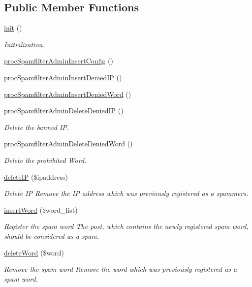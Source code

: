 \subsection*{Public Member Functions}
\begin{DoxyCompactItemize}
\item 
\hyperlink{classspamfilterAdminController_a28483831891491011017a8527221e3f3}{init} ()
\begin{DoxyCompactList}\small\item\em Initialization. \end{DoxyCompactList}\item 
\hyperlink{classspamfilterAdminController_a34c10f8c63e96895ad110241d37577fa}{proc\+Spamfilter\+Admin\+Insert\+Config} ()
\item 
\hyperlink{classspamfilterAdminController_a9f0828d5ddc3b978a7f9de739a27e8c6}{proc\+Spamfilter\+Admin\+Insert\+Denied\+IP} ()
\item 
\hyperlink{classspamfilterAdminController_a8cc8354d502de92a6413aec6be3c0376}{proc\+Spamfilter\+Admin\+Insert\+Denied\+Word} ()
\item 
\hyperlink{classspamfilterAdminController_a720e0592f60455d125b55ee797de2436}{proc\+Spamfilter\+Admin\+Delete\+Denied\+IP} ()
\begin{DoxyCompactList}\small\item\em Delete the banned IP. \end{DoxyCompactList}\item 
\hyperlink{classspamfilterAdminController_aeb21ee58872bf61875be7e0fffabcf3a}{proc\+Spamfilter\+Admin\+Delete\+Denied\+Word} ()
\begin{DoxyCompactList}\small\item\em Delete the prohibited Word. \end{DoxyCompactList}\item 
\hyperlink{classspamfilterAdminController_a19442650a60b49972b158d12a978fcf9}{delete\+IP} (\$ipaddress)
\begin{DoxyCompactList}\small\item\em Delete IP Remove the IP address which was previously registered as a spammers. \end{DoxyCompactList}\item 
\hyperlink{classspamfilterAdminController_ada3859c56fb148b0e4f33266121051c0}{insert\+Word} (\$word\+\_\+list)
\begin{DoxyCompactList}\small\item\em Register the spam word The post, which contains the newly registered spam word, should be considered as a spam. \end{DoxyCompactList}\item 
\hyperlink{classspamfilterAdminController_a57a1cc55622637f806f416da03952ccc}{delete\+Word} (\$word)
\begin{DoxyCompactList}\small\item\em Remove the spam word Remove the word which was previously registered as a spam word. \end{DoxyCompactList}\end{DoxyCompactItemize}
